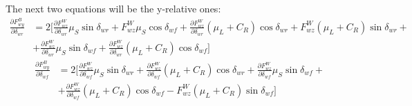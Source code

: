 \documentclass[a4paper,12pt,titlepage]{report}
\begin{document}
	The next two equations will be the y-relative ones:
		\begin{equation} \label{Fwy su deltaR}
			\begin{split}
				\frac{\partial F_{wy}^{B}}{\partial \delta_{wr}} &= 2 [\frac{\partial F_{wz}^{W}}{\partial \delta_{wr}} \mu_{S} \sin \delta_{wr} + F_{wz}^{W} \mu_{S}\cos\delta_{wf} + \frac{\partial F_{wz}^{W}}{\partial \delta_{wr}} (\mu_{L}+C_{R}) \cos\delta_{wr} + F_{wz}^{W}(\mu_{L}+C_{R}) \sin\delta_{wr}+ \\ &+ \frac{\partial F_{wz}^{W}}{\partial \delta_{wr}} \mu_{S} \sin \delta_{wf} + \frac{\partial F_{wz}^{W}}{\partial \delta_{wr}} (\mu_{L}+C_{R})\cos\delta_{wf}]
			\end{split}
		\end{equation}
		\begin{equation} \label{Fwy su deltaF}
			\begin{split}
				\frac{\partial F_{wy}^{B}}{\partial \delta_{wf}} &= 2 [\frac{\partial F_{wz}^{W}}{\partial \delta_{wf}} \mu_{S} \sin \delta_{wr} + \frac{\partial F_{wz}^{W}}{\partial \delta_{wf}} (\mu_{L}+C_{R}) \cos\delta_{wr} + \frac{\partial F_{wz}^{W}}{\partial \delta_{wf}} \mu_{S} \sin \delta_{wf}+ \\ &+ \frac{\partial F_{wz}^{W}}{\partial \delta_{wf}} (\mu_{L}+C_{R})\cos\delta_{wf} - F_{wz}^{W} (\mu_{L}+C_{R}) \sin\delta_{wf}]
			\end{split}
		\end{equation}

\end{document}
